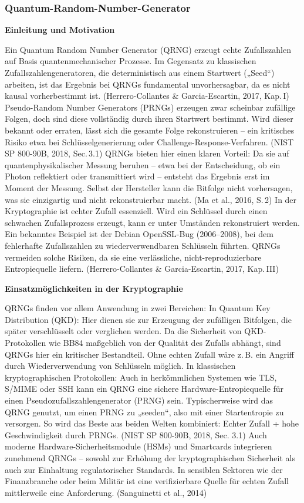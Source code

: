 \subsubsection{Quantum-Random-Number-Generator}
\noindent\textbf{Einleitung und Motivation}

\noindent
Ein Quantum Random Number Generator (QRNG) erzeugt echte Zufallszahlen auf Basis quantenmechanischer Prozesse. Im Gegensatz zu klassischen Zufallszahlengeneratoren, die deterministisch aus einem Startwert („Seed“) arbeiten, ist das Ergebnis bei QRNGs fundamental unvorhersagbar, da es nicht kausal vorherbestimmt ist.
 (Herrero-Collantes & Garcia-Escartin, 2017, Kap. I)
Pseudo-Random Number Generators (PRNGs) erzeugen zwar scheinbar zufällige Folgen, doch sind diese vollständig durch ihren Startwert bestimmt. Wird dieser bekannt oder erraten, lässt sich die gesamte Folge rekonstruieren – ein kritisches Risiko etwa bei Schlüsselgenerierung oder Challenge-Response-Verfahren.
 (NIST SP 800-90B, 2018, Sec. 3.1)
QRNGs bieten hier einen klaren Vorteil: Da sie auf quantenphysikalischer Messung beruhen – etwa bei der Entscheidung, ob ein Photon reflektiert oder transmittiert wird – entsteht das Ergebnis erst im Moment der Messung. Selbst der Hersteller kann die Bitfolge nicht vorhersagen, was sie einzigartig und nicht rekonstruierbar macht.
 (Ma et al., 2016, S. 2)
In der Kryptographie ist echter Zufall essenziell. Wird ein Schlüssel durch einen schwachen Zufallsprozess erzeugt, kann er unter Umständen rekonstruiert werden. Ein bekanntes Beispiel ist der Debian OpenSSL-Bug (2006–2008), bei dem fehlerhafte Zufallszahlen zu wiederverwendbaren Schlüsseln führten. QRNGs vermeiden solche Risiken, da sie eine verlässliche, nicht-reproduzierbare Entropiequelle liefern.
 (Herrero-Collantes & Garcia-Escartin, 2017, Kap. III)


\vspace{1em}
\noindent\textbf{Einsatzmöglichkeiten in der Kryptographie}

\noindent
QRNGs finden vor allem Anwendung in zwei Bereichen:
\smallskip
In Quantum Key Distribution (QKD): Hier dienen sie zur Erzeugung der zufälligen Bitfolgen, die später verschlüsselt oder verglichen werden. Da die Sicherheit von QKD-Protokollen wie BB84 maßgeblich von der Qualität des Zufalls abhängt, sind QRNGs hier ein kritischer Bestandteil. Ohne echten Zufall wäre z. B. ein Angriff durch Wiederverwendung von Schlüsseln möglich.
\smallskip
In klassischen kryptographischen Protokollen: Auch in herkömmlichen Systemen wie TLS, S/MIME oder SSH kann ein QRNG eine sichere Hardware-Entropiequelle für einen Pseudozufallszahlengenerator (PRNG) sein. Typischerweise wird das QRNG genutzt, um einen PRNG zu „seeden“, also mit einer Startentropie zu versorgen. So wird das Beste aus beiden Welten kombiniert: Echter Zufall + hohe Geschwindigkeit durch PRNGs.
\smallskip
(NIST SP 800-90B, 2018, Sec. 3.1)
Auch moderne Hardware-Sicherheitsmodule (HSMs) und Smartcards integrieren zunehmend QRNGs – sowohl zur Erhöhung der kryptographischen Sicherheit als auch zur Einhaltung regulatorischer Standards. In sensiblen Sektoren wie der Finanzbranche oder beim Militär ist eine verifizierbare Quelle für echten Zufall mittlerweile eine Anforderung.
(Sanguinetti et al., 2014)


